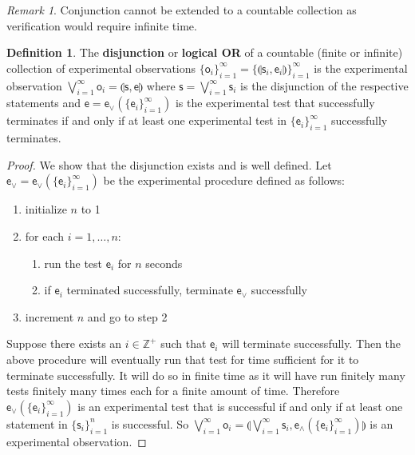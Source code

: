 \documentclass[review]{elsarticle}
\theoremstyle{plain}%
\theoremstyle{definition}
\newtheorem{defn}{Definition}[section]
\theoremstyle{remark}
\newtheorem*{rem}{Remark}
\begin{document}
\begin{rem}
	Conjunction cannot be extended to a countable collection as verification would require infinite time.
\end{rem}

\begin{defn}
	The \textbf{disjunction} or \textbf{logical OR} of a countable (finite or infinite) collection of experimental observations $\{\mathsf{o}_i\}_{i=1}^{\infty}=\{\llparenthesis \mathsf{s}_i, \mathsf{e}_i\rrparenthesis\}_{i=1}^{\infty}$ is the experimental observation $\bigvee\limits_{i=1}^{\infty} \mathsf{o}_i = \llparenthesis \mathsf{s}, \mathsf{e}\rrparenthesis$ where $\mathsf{s} = \bigvee\limits_{i=1}^{\infty} \mathsf{s}_i$ is the disjunction of the respective statements and $\mathsf{e} = \mathsf{e}_\vee(\{\mathsf{e}_i\}_{i=1}^{\infty})$ is the experimental test that successfully terminates if and only if at least one experimental test in $\{\mathsf{e}_i\}_{i=1}^{\infty}$ successfully terminates.
\end{defn}

\begin{proof}
	We show that the disjunction exists and is well defined. Let $\mathsf{e}_\vee=\mathsf{e}_\vee(\{\mathsf{e}_i\}_{i=1}^{\infty})$ be the experimental procedure defined as follows:
	\begin{enumerate}
	\item initialize $n$ to 1
	\item for each $i=1,\ldots,n$:
	\begin{enumerate}
		\item run the test $\mathsf{e}_i$ for $n$ seconds
		\item if $\mathsf{e}_i$ terminated successfully, terminate $\mathsf{e}_\vee$ successfully
	\end{enumerate}
	\item increment $n$ and go to step 2
	\end{enumerate}
	Suppose there exists an $i \in \mathbb{Z}^+$ such that $\mathsf{e}_i$ will terminate successfully. Then the above procedure will eventually run that test for time sufficient for it to terminate successfully. It will do so in finite time as it will have run finitely many tests finitely many times each for a finite amount of time. Therefore $\mathsf{e}_\vee(\{\mathsf{e}_i\}_{i=1}^{\infty})$ is an experimental test that is successful if and only if at least one statement in $\{\mathsf{s}_i\}_{i=1}^{n}$ is successful. So $\bigvee\limits_{i=1}^{\infty} \mathsf{o}_i =\llparenthesis\bigvee\limits_{i=1}^{\infty} \mathsf{s}_i, \mathsf{e}_{\wedge}(\{\mathsf{e}_i\}_{i=1}^{\infty})\rrparenthesis$ is an experimental observation.
\end{proof}
\end{document}
